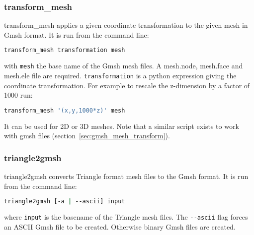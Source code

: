 
\subsubsection{transform\_mesh}
\label{sec:transform_mesh}

transform\_mesh applies a given coordinate transformation to the given mesh in Gmsh format. It is run from the command line:
\begin{lstlisting}[language = Bash]
transform_mesh transformation mesh
\end{lstlisting}
with \lstinline[language = Bash]+mesh+ the base name of the Gmsh mesh files. A mesh.node, mesh.face and mesh.ele file are required. \lstinline[language = Bash]+transformation+ is a python expression giving the coordinate transformation. For example to rescale the z-dimension by a factor of 1000 run:
\begin{lstlisting}[language = Bash]
transform_mesh '(x,y,1000*z)' mesh
\end{lstlisting}
It can be used for 2D or 3D meshes. Note that a similar script exists to work with gmsh files (section~\ref{sec:gmsh_mesh_transform}).


\subsubsection{triangle2gmsh}
\label{sec:triangle2gmsh}
triangle2gmsh converts Triangle format mesh files to the Gmsh format.
It is run from the command line:
\begin{lstlisting}[language = Bash]
triangle2gmsh [-a | --ascii] input
\end{lstlisting}
where \lstinline[language = Bash]+input+ is the basename of the Triangle mesh files.
The \lstinline[language = Bash]+--ascii+ flag forces an ASCII Gmsh file to be created. Otherwise binary Gmsh files are created.


%
%

